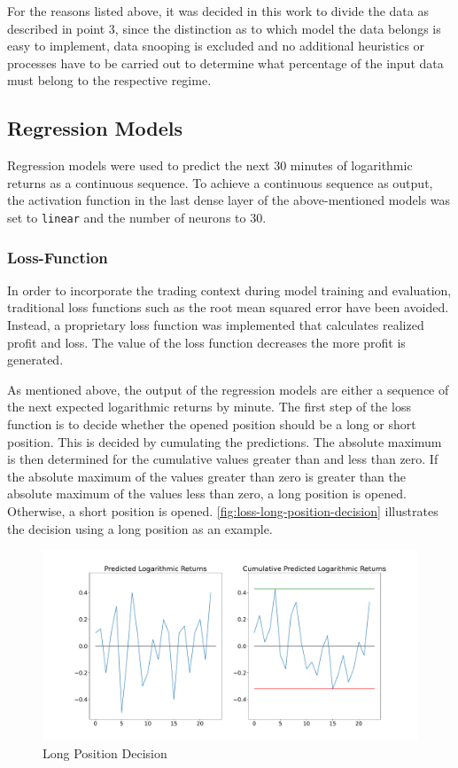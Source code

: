 \noindent
For the reasons listed above, it was decided in this work to divide the data as described in point 3, since the distinction as to which model the data belongs is easy to implement, data snooping is excluded and no additional heuristics or processes have to be carried out to determine what percentage of the input data must belong to the respective regime.

\subsection{Regression Models}
\label{chap:regression-models}

Regression models were used to predict the next 30 minutes of logarithmic returns as a continuous sequence.
To achieve a continuous sequence as output, the activation function in the last dense layer of the above-mentioned models was set to \verb|linear| and the number of neurons to 30.

\subsubsection{Loss-Function}
\label{chap:regression-loss}

In order to incorporate the trading context during model training and evaluation, traditional loss functions such as the root mean squared error have been avoided.
Instead, a proprietary loss function was implemented that calculates realized profit and loss.
The value of the loss function decreases the more profit is generated.

As mentioned above, the output of the regression models are either a sequence of the next expected logarithmic returns by minute.
The first step of the loss function is to decide whether the opened position should be a long or short position.
This is decided by cumulating the predictions.
The absolute maximum is then determined for the cumulative values greater than and less than zero.
If the absolute maximum of the values greater than zero is greater than the absolute maximum of the values less than zero, a long position is opened.
Otherwise, a short position is opened.
\autoref{fig:loss-long-position-decision} illustrates the decision using a long position as an example.

\begin{figure}[H]
    \centering
    \includegraphics[width=\textwidth]{images/models/loss_direction}
    \caption{Long Position Decision}
    \label{fig:loss-long-position-decision}
\end{figure}

